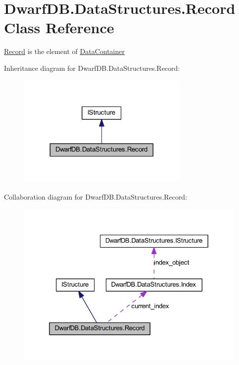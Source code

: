 \hypertarget{class_dwarf_d_b_1_1_data_structures_1_1_record}{\section{Dwarf\+D\+B.\+Data\+Structures.\+Record Class Reference}
\label{class_dwarf_d_b_1_1_data_structures_1_1_record}
}


\hyperlink{class_dwarf_d_b_1_1_data_structures_1_1_record}{Record} is the element of \hyperlink{class_dwarf_d_b_1_1_data_structures_1_1_data_container}{Data\+Container}  




Inheritance diagram for Dwarf\+D\+B.\+Data\+Structures.\+Record\+:\nopagebreak
\begin{figure}[H]
\begin{center}
\leavevmode
\includegraphics[width=236pt]{class_dwarf_d_b_1_1_data_structures_1_1_record__inherit__graph}
\end{center}
\end{figure}


Collaboration diagram for Dwarf\+D\+B.\+Data\+Structures.\+Record\+:\nopagebreak
\begin{figure}[H]
\begin{center}
\leavevmode
\includegraphics[width=325pt]{class_dwarf_d_b_1_1_data_structures_1_1_record__coll__graph}
\end{center}
\end{figure}

